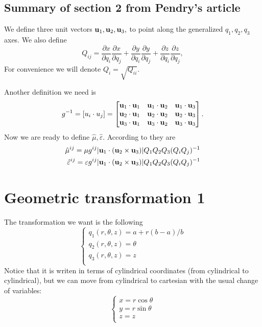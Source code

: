 \documentclass{amsart}
\begin{document}
\subsection{Summary of section 2 from Pendry's article}
We define three unit vectors $\textbf{u}_1,\textbf{u}_2,\textbf{u}_3,$ to point along the generalized $q_1,q_2,q_3$ axes.
We also define
\begin{equation}\label{matrixQ}
  Q_{ij}=\frac{\partial x}{\partial q_i}\frac{\partial x}{\partial q_j}+\frac{\partial y}{\partial q_i}\frac{\partial y}{\partial q_j}+\frac{\partial z}{\partial q_i}\frac{\partial z}{\partial q_j},
\end{equation}
For convenience we will denote $Q_i=\sqrt{Q_{ii}}$.

Another definition we need is
\begin{equation}\label{matrixg}
  g^{-1}=[u_i\cdot u_j]=\begin{bmatrix}
    \textbf{u}_1\cdot \textbf{u}_1 & \textbf{u}_1\cdot \textbf{u}_2 & \textbf{u}_1\cdot \textbf{u}_3 \\
    \textbf{u}_2\cdot \textbf{u}_1 & \textbf{u}_2\cdot \textbf{u}_2 & \textbf{u}_2\cdot \textbf{u}_3 \\
    \textbf{u}_3\cdot \textbf{u}_1 & \textbf{u}_3\cdot \textbf{u}_2 & \textbf{u}_3\cdot \textbf{u}_3
  \end{bmatrix}.
\end{equation}
Now we are ready to define $\hat{\mu},\hat{\varepsilon}$. According to \cite{ward96} they are
\begin{align}
  \hat{\mu}^{ij}=\mu g^{ij}|\textbf{u}_1\cdot(\textbf{u}_2\times \textbf{u}_3)|Q_1Q_2Q_3(Q_iQ_j)^{-1}\\
  \hat{\varepsilon}^{ij}=\varepsilon g^{ij}|\textbf{u}_1\cdot(\textbf{u}_2\times \textbf{u}_3)|Q_1Q_2Q_3(Q_iQ_j)^{-1} \nonumber
\end{align}

\section{Geometric transformation 1}
The transformation we want is the following
\[\begin{cases}
  q_1(r,\theta,z)=a+r(b-a)/b\\
  q_2(r,\theta,z)=\theta\\
  q_3(r,\theta,z)=z\\
\end{cases}\]
Notice that it is writen in terms of cylindrical coordinates
(from cylindrical to cylindrical), but we can move from cylindrical
to cartesian with the usual change of variables:
\begin{equation}
  \begin{cases}\label{cylindrical}
  x=r\cos\theta\\
  y=r\sin\theta\\
  z=z\\
\end{cases}
\end{equation}
\end{document}

